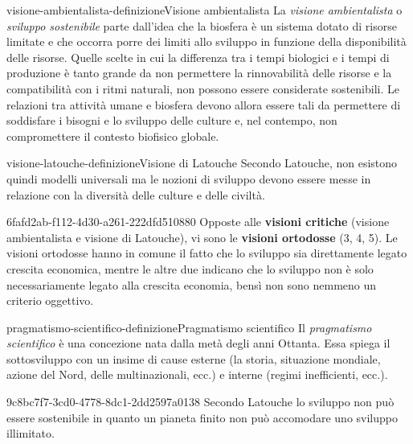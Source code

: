 \documentclass[preview]{standalone}
\begin{document}
\begin{snippetdefinition}{visione-ambientalista-definizione}{Visione ambientalista}
    La \textit{visione ambientalista} o \textit{sviluppo sostenibile}
    parte dall'idea che la biosfera è un sistema
    dotato di risorse limitate e che occorra porre dei limiti allo sviluppo in
    funzione della disponibilità delle risorse. Quelle scelte in cui la differenza tra
    i tempi biologici e i tempi di produzione è tanto grande da non permettere
    la rinnovabilità delle risorse e la compatibilità con i ritmi naturali, non
    possono essere considerate sostenibili. Le relazioni tra attività umane e
    biosfera devono allora essere tali da permettere di soddisfare i bisogni e lo
    sviluppo delle culture e, nel contempo, non compromettere il contesto
    biofisico globale.
\end{snippetdefinition}

\begin{snippetdefinition}{visione-latouche-definizione}{Visione di Latouche}
    Secondo Latouche, non esistono quindi modelli universali
    ma le nozioni di sviluppo devono essere messe in relazione con la diversità
    delle culture e delle civiltà.
\end{snippetdefinition}

\begin{snippet}{6fafd2ab-f112-4d30-a261-222dfd510880}
    Opposte alle \textbf{visioni critiche} (visione ambientalista e visione di Latouche),
    vi sono le \textbf{visioni ortodosse} (3, 4, 5).
    Le visioni ortodosse hanno in comune il fatto che lo sviluppo sia direttamente legato crescita economica,
    mentre le altre due indicano che lo sviluppo non è solo necessariamente legato alla crescita economia,
    bensì non sono nemmeno un criterio oggettivo.
\end{snippet}

\begin{snippetdefinition}{pragmatismo-scientifico-definizione}{Pragmatismo scientifico}
    Il \textit{pragmatismo scientifico} è una concezione nata dalla metà degli anni Ottanta.
    Essa spiega il sottosviluppo con un insime di cause esterne (la storia, situazione mondiale, azione del Nord, delle multinazionali, ecc.)
    e interne (regimi inefficienti, ecc.).
\end{snippetdefinition}


\begin{snippet}{9c8bc7f7-3cd0-4778-8dc1-2dd2597a0138}
    Secondo Latouche lo sviluppo non può essere sostenibile in quanto
    un pianeta finito non può accomodare uno sviluppo illimitato.
\end{snippet}
\end{document}
